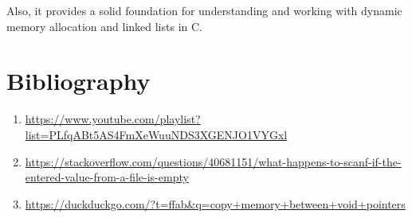 \documentclass[12pt]{article}
\begin{document}
Also, it provides a solid foundation for understanding and working with dynamic memory allocation and linked lists in C.

\section*{Bibliography}
\hspace{0.8cm}
\begin{enumerate}
    \item  \label{plist} \url{https://www.youtube.com/playlist?list=PLfqABt5AS4FmXeWuuNDS3XGENJO1VYGxl}
    \item \url{https://stackoverflow.com/questions/40681151/what-happens-to-scanf-if-the-entered-value-from-a-file-is-empty}
    \item \url{https://duckduckgo.com/?t=ffab&q=copy+memory+between+void+pointers}
\end{enumerate}

\pagebreak
\end{document}
